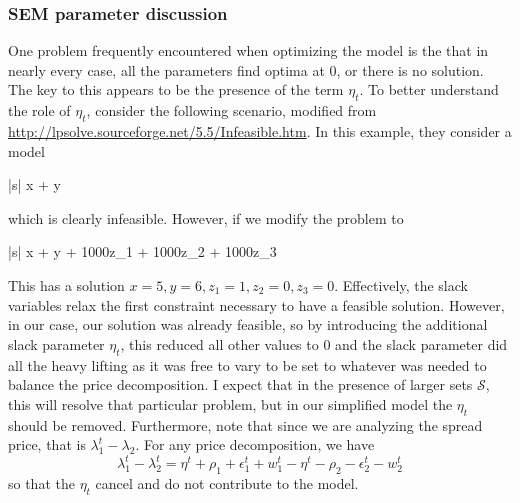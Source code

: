 \documentclass[11pt, letterpaper,nounbold]{article}
\begin{document}
\subsubsection{SEM parameter discussion}
One problem frequently encountered when optimizing the model is the that in nearly every case, all the parameters find optima at $0$, or there is no solution. The key to this appears to be the presence of the term $\eta_{t}$. To better understand the role of $\eta_{t}$, consider the following scenario, modified from \url{http://lpsolve.sourceforge.net/5.5/Infeasible.htm}. In this example, they consider a model
		\begin{mini*}|s|
		{}{x + y}{}{}
	\end{mini*}
which is clearly infeasible. However, if we modify the problem to 
			\begin{mini*}|s|
		{}{x + y + 1000z_1 + 1000z_2 + 1000z_3}{}{}
		\addConstraint{x +z_1\geq 6}
		\addConstraint{y +z_2\geq 6}
		\addConstraint{x + y -z_3\leq 11}
	\end{mini*}
This has a solution $x = 5, y = 6, z_1 =1, z_2 = 0, z_3 = 0$. Effectively, the slack variables relax the first constraint necessary to have a feasible solution. However, in our case, our solution was already feasible, so by introducing the additional slack parameter $\eta_{t}$, this reduced all other values to $0$ and the slack parameter did all the heavy lifting as it was free to vary to be set to whatever was needed to balance the price decomposition. I expect that in the presence of larger sets $\mathcal{S}$, this will resolve that particular problem, but in our simplified model the $\eta_{t}$ should be removed. Furthermore, note that since we are analyzing the spread price, that is $\lambda_{1}^{t} - \lambda_{2}$. For any price decomposition, we have
	\[\lambda_{1}^{t} - \lambda_{2}^{t} = \eta^{t} + \rho_{1} + \epsilon_{1}^{t} + w_{1}^{t} - \eta^{t} - \rho_{2} - \epsilon_{2}^{t} - w_{2}^{t}\]
so that the $\eta_{t}$ cancel and do not contribute to the model.
\end{document}
